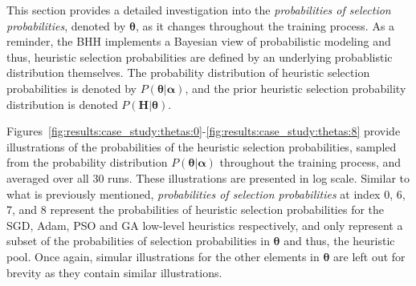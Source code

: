 This section provides a detailed investigation into the \textit{probabilities of selection probabilities}, denoted by $\boldsymbol{\theta}$, as it changes throughout the training process. As a reminder, the \acs{BHH} implements a Bayesian view of probabilistic modeling and thus, heuristic selection probabilities are defined by an underlying probablistic distribution themselves. The probability distribution of heuristic selection probabilities is denoted by $P(\boldsymbol{\theta} \vert \boldsymbol{\alpha})$, and the prior heuristic selection probability distribution is denoted $P(\boldsymbol{H} \vert \boldsymbol{\theta})$.

Figures~\ref{fig:results:case_study:thetas:0}-\ref{fig:results:case_study:thetas:8} provide illustrations of the probabilities of the heuristic selection probabilities, sampled from the probability distribution $P(\boldsymbol{\theta} \vert \boldsymbol{\alpha})$ throughout the training process, and averaged over all 30 runs. These illustrations are presented in log scale. Similar to what is previously mentioned, \textit{probabilities of selection probabilities} at index 0, 6, 7, and 8 represent the probabilities of heuristic selection probabilities for the \acs{SGD}, \acs{Adam}, \acs{PSO} and \acs{GA} low-level heuristics respectively, and only represent a subset of the probabilities of selection probabilities in $\boldsymbol{\theta}$ and thus, the heuristic pool. Once again, simular illustrations for the other elements in $\boldsymbol{\theta}$ are left out for brevity as they contain similar illustrations.

